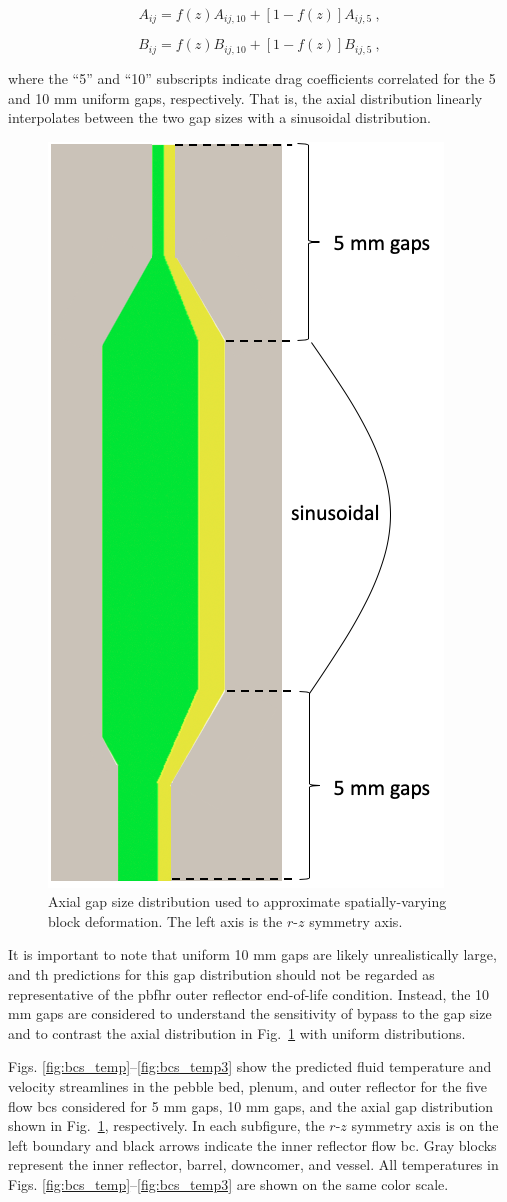 \begin{equation}
A_{ij}=f(z)A_{ij,10}+\left\lbrack1-f(z)\right\rbrack A_{ij,5}\ ,
\end{equation}

\begin{equation}
B_{ij}=f(z)B_{ij,10}+\left\lbrack1-f(z)\right\rbrack B_{ij,5}\ ,
\end{equation}

\noindent where the ``5'' and ``10'' subscripts indicate drag coefficients correlated for the 5 and 10 \si{\milli\meter} uniform gaps, respectively. That is, the axial distribution linearly interpolates between the two gap sizes with a sinusoidal distribution. 

\begin{figure}[h!]
\centering
\hspace{1.5cm}
\includegraphics[width=0.255\linewidth]{figs/axial_gaps.png}
\caption{Axial gap size distribution used to approximate spatially-varying block deformation. The left axis is the $r$-$z$ symmetry axis.}
\label{fig:axial_gaps}
\end{figure}

It is important to note that uniform 10 \si{\milli\meter} gaps are likely unrealistically large, and \gls{th} predictions for this gap distribution should not be regarded as representative of the \gls{pbfhr} outer reflector end-of-life condition. Instead, the 10 \si{\milli\meter} gaps are considered to understand the sensitivity of bypass to the gap size and to contrast the axial distribution in Fig.\ \ref{fig:axial_gaps} with uniform distributions.

Figs. \ref{fig:bcs_temp}--\ref{fig:bcs_temp3} show the predicted fluid temperature and velocity streamlines in the pebble bed, plenum, and outer reflector for the five flow \glspl{bc} considered for 5 \si{\milli\meter} gaps, 10 \si{\milli\meter} gaps, and the axial gap distribution shown in Fig.\ \ref{fig:axial_gaps}, respectively. In each subfigure, the $r$-$z$ symmetry axis is on the left boundary and black arrows indicate the inner reflector flow \gls{bc}. Gray blocks represent the inner reflector, barrel, downcomer, and vessel. All temperatures in Figs. \ref{fig:bcs_temp}--\ref{fig:bcs_temp3} are shown on the same color scale.

